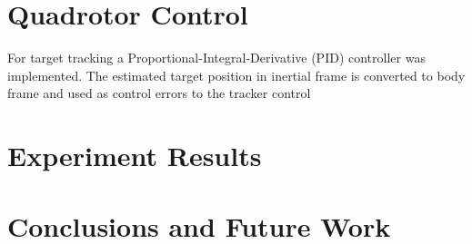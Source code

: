 \documentclass[letterpaper, 10 pt, conference]{ieeeconf}
\begin{document}
\section{Quadrotor Control}
For target tracking a Proportional-Integral-Derivative (PID) controller
was implemented. The estimated target position in inertial frame is
converted to body frame and used as control errors to the tracker control




\section{Experiment Results}



\section{Conclusions and Future Work}



\end{document}
